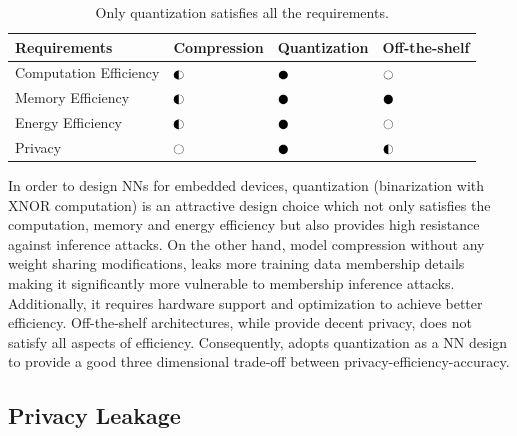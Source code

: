 \begin{table}[!htb]
\begin{center}
\renewcommand\arraystretch{1.5}
\fontsize{6.5pt}{6.5pt}\selectfont
\begin{tabular}{|l||l|l|l|}
\hline
Requirements & Compression & Quantization & Off-the-shelf  \\
\hline
Computation Efficiency & $\smark$  & $\cmark$   & $\xmark$ \\
\hline
Memory Efficiency &  $\smark$ & $\cmark$   & $\cmark$ \\
\hline
Energy Efficiency &  $\smark$   & $\cmark$   & $\xmark$ \\
\hline
Privacy &  $\xmark$   & $\cmark$   & $\smark$ \\
\hline
\end{tabular}
\end{center}
\caption{Only quantization satisfies all the requirements.}
\label{tbl:comparison}
\vspace{-4mm}
\end{table}

In order to design NNs for embedded devices, quantization (binarization with XNOR computation) is an attractive design choice which not only satisfies the computation, memory and energy efficiency but also provides high resistance against inference attacks.
On the other hand, model compression without any weight sharing modifications, leaks more training data membership details making it significantly more vulnerable to membership inference attacks. Additionally, it requires hardware support and optimization to achieve better efficiency.
Off-the-shelf architectures, while provide decent privacy, does not satisfy all aspects of efficiency.
Consequently, \method\hspace{0.01in} adopts quantization as a NN design to provide a good three dimensional trade-off between privacy-efficiency-accuracy.




\subsection{Privacy Leakage}
\label{eval-leakage}

